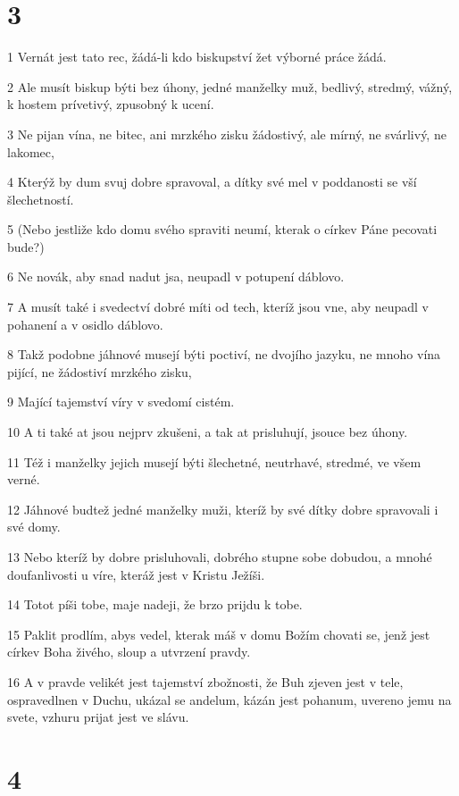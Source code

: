\chapter{3}

\par 1 Vernát jest tato rec, žádá-li kdo biskupství žet výborné práce žádá.
\par 2 Ale musít biskup býti bez úhony, jedné manželky muž, bedlivý, stredmý, vážný, k hostem prívetivý, zpusobný k ucení.
\par 3 Ne pijan vína, ne bitec, ani mrzkého zisku žádostivý, ale mírný, ne svárlivý, ne lakomec,
\par 4 Kterýž by dum svuj dobre spravoval, a dítky své mel v poddanosti se vší šlechetností.
\par 5 (Nebo jestliže kdo domu svého spraviti neumí, kterak o církev Páne pecovati bude?)
\par 6 Ne novák, aby snad nadut jsa, neupadl v potupení dáblovo.
\par 7 A musít také i svedectví dobré míti od tech, kteríž jsou vne, aby neupadl v pohanení a v osidlo dáblovo.
\par 8 Takž podobne jáhnové musejí býti poctiví, ne dvojího jazyku, ne mnoho vína pijící, ne žádostiví mrzkého zisku,
\par 9 Mající tajemství víry v svedomí cistém.
\par 10 A ti také at jsou nejprv zkušeni, a tak at prisluhují, jsouce bez úhony.
\par 11 Též i manželky jejich musejí býti šlechetné, neutrhavé, stredmé, ve všem verné.
\par 12 Jáhnové budtež jedné manželky muži, kteríž by své dítky dobre spravovali i své domy.
\par 13 Nebo kteríž by dobre prisluhovali, dobrého stupne sobe dobudou, a mnohé doufanlivosti u víre, kteráž jest v Kristu Ježíši.
\par 14 Totot píši tobe, maje nadeji, že brzo prijdu k tobe.
\par 15 Paklit prodlím, abys vedel, kterak máš v domu Božím chovati se, jenž jest církev Boha živého, sloup a utvrzení pravdy.
\par 16 A v pravde velikét jest tajemství zbožnosti, že Buh zjeven jest v tele, ospravedlnen v Duchu, ukázal se andelum, kázán jest pohanum, uvereno jemu na svete, vzhuru prijat jest ve slávu.

\chapter{4}

